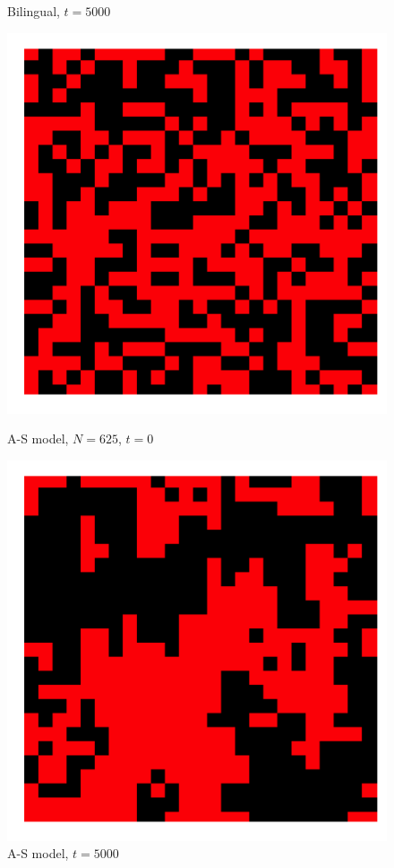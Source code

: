 \begin{figure}[h]
\begin{minipage}[t]{0.4\linewidth}
    \caption{\scriptsize Bilingual, \(t=5000\)}
    \label{reg_net_bi2}
\end{minipage}
\vspace{-5pt}
\begin{minipage}[t]{0.4\linewidth}
    \centering
    \includegraphics[width=\textwidth]{images/task29/smallw_Strogatz_t=1.png} 
    \caption{\scriptsize A-S model, \(N=625\), \(t=0\)}
    \label{reg_net_Str1}
\end{minipage}
\hfill
\begin{minipage}[t]{0.4\linewidth}
    \centering
    \includegraphics[width=\textwidth]{images/task29/smallw_Strogatz_t=5000.png} 
    \caption{\scriptsize A-S model, \(t=5000\)}
    \label{reg_net_Str2}
\end{minipage}
\end{figure}


